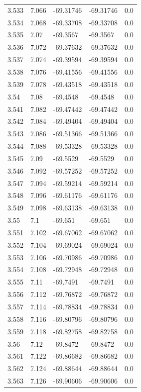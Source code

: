 \begin{tabular}{lllll}
3.533 & 7.066 & -69.31746 & -69.31746 & 0.0 \\
3.534 & 7.068 & -69.33708 & -69.33708 & 0.0 \\
3.535 & 7.07 & -69.3567 & -69.3567 & 0.0 \\
3.536 & 7.072 & -69.37632 & -69.37632 & 0.0 \\
3.537 & 7.074 & -69.39594 & -69.39594 & 0.0 \\
3.538 & 7.076 & -69.41556 & -69.41556 & 0.0 \\
3.539 & 7.078 & -69.43518 & -69.43518 & 0.0 \\
3.54 & 7.08 & -69.4548 & -69.4548 & 0.0 \\
3.541 & 7.082 & -69.47442 & -69.47442 & 0.0 \\
3.542 & 7.084 & -69.49404 & -69.49404 & 0.0 \\
3.543 & 7.086 & -69.51366 & -69.51366 & 0.0 \\
3.544 & 7.088 & -69.53328 & -69.53328 & 0.0 \\
3.545 & 7.09 & -69.5529 & -69.5529 & 0.0 \\
3.546 & 7.092 & -69.57252 & -69.57252 & 0.0 \\
3.547 & 7.094 & -69.59214 & -69.59214 & 0.0 \\
3.548 & 7.096 & -69.61176 & -69.61176 & 0.0 \\
3.549 & 7.098 & -69.63138 & -69.63138 & 0.0 \\
3.55 & 7.1 & -69.651 & -69.651 & 0.0 \\
3.551 & 7.102 & -69.67062 & -69.67062 & 0.0 \\
3.552 & 7.104 & -69.69024 & -69.69024 & 0.0 \\
3.553 & 7.106 & -69.70986 & -69.70986 & 0.0 \\
3.554 & 7.108 & -69.72948 & -69.72948 & 0.0 \\
3.555 & 7.11 & -69.7491 & -69.7491 & 0.0 \\
3.556 & 7.112 & -69.76872 & -69.76872 & 0.0 \\
3.557 & 7.114 & -69.78834 & -69.78834 & 0.0 \\
3.558 & 7.116 & -69.80796 & -69.80796 & 0.0 \\
3.559 & 7.118 & -69.82758 & -69.82758 & 0.0 \\
3.56 & 7.12 & -69.8472 & -69.8472 & 0.0 \\
3.561 & 7.122 & -69.86682 & -69.86682 & 0.0 \\
3.562 & 7.124 & -69.88644 & -69.88644 & 0.0 \\
3.563 & 7.126 & -69.90606 & -69.90606 & 0.0 \\

\end{tabular}
